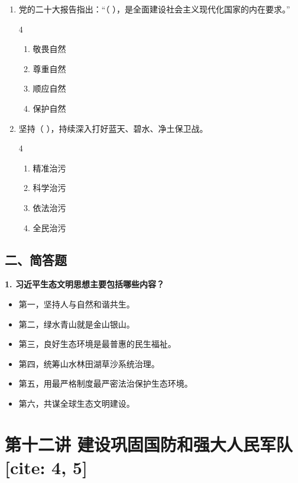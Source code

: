 \documentclass[a4paper,11pt]{ctexart}
\begin{document}
\begin{enumerate}
    \item 党的二十大报告指出：“（ ），是全面建设社会主义现代化国家的内在要求。”
    \begin{multicols}{4}
    \begin{enumerate}
        \item 敬畏自然
        \item 尊重自然
        \item 顺应自然
        \item 保护自然
    \end{enumerate}
    \end{multicols}

    \item 坚持（ ），持续深入打好蓝天、碧水、净土保卫战。
    \begin{multicols}{4}
    \begin{enumerate}
        \item 精准治污
        \item 科学治污
        \item 依法治污
        \item 全民治污
    \end{enumerate}
    \end{multicols}
\end{enumerate}

\subsection{二、简答题}
\textbf{1. 习近平生态文明思想主要包括哪些内容？}
\begin{itemize}
    \item 第一，坚持人与自然和谐共生。
    \item 第二，绿水青山就是金山银山。
    \item 第三，良好生态环境是最普惠的民生福祉。
    \item 第四，统筹山水林田湖草沙系统治理。
    \item 第五，用最严格制度最严密法治保护生态环境。
    \item 第六，共谋全球生态文明建设。
\end{itemize}

\newpage

\section{第十二讲 建设巩固国防和强大人民军队 [cite: 4, 5]}
\end{document}
